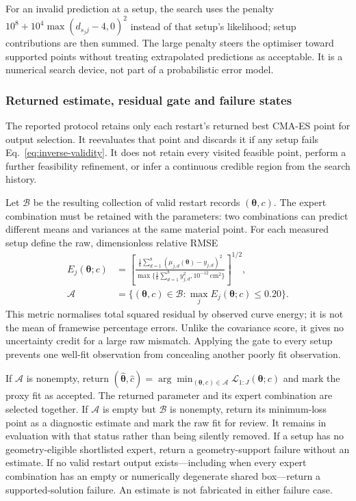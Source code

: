 For an invalid prediction at a setup, the search uses the penalty
$10^8+10^4\max(d_{s_jj}-4,0)^2$ instead of that setup's likelihood;
setup contributions are then summed. The large penalty steers the
optimiser toward supported points without treating extrapolated predictions
as acceptable. It is a numerical search device, not part of a probabilistic
error model.

\subsubsection{Returned estimate, residual gate and failure states}
\label{sec:inverse-output}
The reported protocol retains only each restart's returned best CMA-ES
point for output selection. It reevaluates that point and discards it
if any setup fails Eq.~\eqref{eq:inverse-validity}. It does not retain
every visited feasible point, perform a further feasibility refinement,
or infer a continuous credible region from the search history.

Let $\mathcal B$ be the resulting collection of valid restart records
$(\boldsymbol\theta,c)$. The expert combination must be retained with
the parameters: two combinations can predict different means and
variances at the same material point.
For each measured setup define the raw, dimensionless relative RMSE
\begin{equation}
\label{eq:inverse-raw-relative-rmse}
\begin{aligned}
 E_j(\boldsymbol\theta;c)&=
 \left[\frac{\frac18\sum_{d=1}^{8}
      (\mu_{j,d}(\boldsymbol\theta)-y_{j,d})^2}
 {\max\{\frac18\sum_{d=1}^{8}y_{j,d}^2,
                    10^{-12}\,\mathrm{cm}^2\}}\right]^{1/2},\\
 \mathcal A&=\{(\boldsymbol\theta,c)\in\mathcal B:
                         \max_jE_j(\boldsymbol\theta;c)\leq0.20\}.
\end{aligned}
\end{equation}
This metric normalises total squared residual by observed curve energy;
it is not the mean of framewise percentage errors. Unlike the covariance
score, it gives no uncertainty credit for a large raw mismatch. Applying
the gate to every setup prevents one well-fit observation from concealing
another poorly fit observation.

If $\mathcal A$ is nonempty, return
$ (\widehat{\boldsymbol\theta},\hat c)
=\arg\min_{(\boldsymbol\theta,c)\in\mathcal A}
\mathcal L_{1:J}(\boldsymbol\theta;c)$ and mark the proxy fit as accepted.
The returned parameter and its expert combination are selected together.
If $\mathcal A$ is
empty but $\mathcal B$ is nonempty, return its minimum-loss point
as a diagnostic estimate and mark the raw fit for review. It remains
in evaluation with that status rather than being silently removed.
If a setup has no geometry-eligible shortlisted expert, return a
geometry-support failure without an estimate. If no valid restart output
exists---including when every expert combination has an empty or
numerically degenerate shared box---return a supported-solution failure.
An estimate is not fabricated in either failure case.

